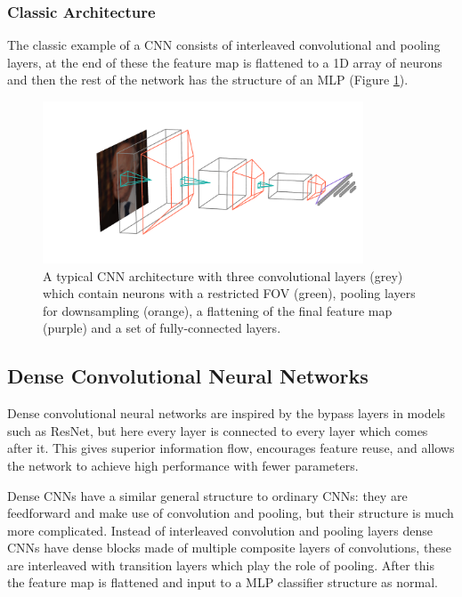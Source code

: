\subsubsection{Classic Architecture}
The classic example of a CNN consists of interleaved convolutional and pooling layers, at the end of these the feature map is flattened to a 1D array of neurons and then the rest of the network has the structure of an MLP (Figure \ref{fig:machine_learning:classic_CNN}). 
\begin{figure}[h!]
    \includegraphics[width=0.85\textwidth]{figures/machine_learning/convnet_arch.pdf}
    \caption{A typical CNN architecture with three convolutional layers (grey) which contain neurons with a restricted FOV (green), pooling layers for downsampling (orange), a flattening of the final feature map (purple) and a set of fully-connected layers.}
        \label{fig:machine_learning:classic_CNN}
\end{figure}


\subsection{Dense Convolutional Neural Networks}
Dense convolutional neural networks \cite{DenseNet} are inspired by the bypass layers in models such as  ResNet, but here every layer is connected to every layer which comes after it. 
This gives superior information flow, encourages feature reuse, and allows the network to achieve high performance with fewer parameters. 

Dense CNNs have a similar general structure to ordinary CNNs: they are feedforward and make use of convolution and pooling, but their structure is much more complicated. 
Instead of interleaved convolution and pooling layers dense CNNs have dense blocks made of multiple composite layers of convolutions, these are interleaved with transition layers which play the role of pooling. After this the feature map is flattened and input to a MLP classifier structure as normal. 

